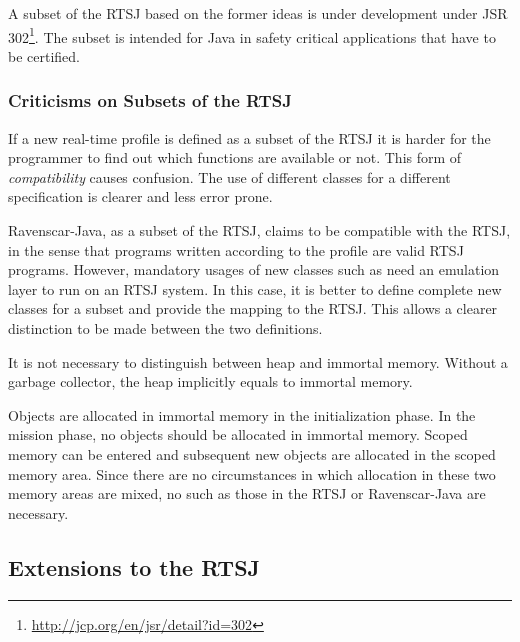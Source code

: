 A subset of the RTSJ based on the former ideas is under development
under JSR 302\footnote{\url{http://jcp.org/en/jsr/detail?id=302}}.
The subset is intended for Java in safety critical applications that
have to be certified.

\subsubsection{Criticisms on Subsets of the RTSJ}

If a new real-time profile is defined as a subset of the RTSJ it is
harder for the programmer to find out which functions are available
or not. This form of \textit{compatibility} causes confusion. The
use of different classes for a different specification is clearer
and less error prone.

Ravenscar-Java, as a subset of the RTSJ, claims to be compatible
with the RTSJ, in the sense that programs written according to the
profile are valid RTSJ programs. However, mandatory usages of new
classes such as  need an emulation layer to run
on an RTSJ system. In this case, it is better to define complete new
classes for a subset and provide the mapping to the RTSJ. This
allows a clearer distinction to be made between the two definitions.

It is not necessary to distinguish between heap and immortal memory.
Without a garbage collector, the heap implicitly equals to immortal
memory.

Objects are allocated in immortal memory in the initialization
phase. In the mission phase, no objects should be allocated in
immortal memory. Scoped memory can be entered and subsequent new
objects are allocated in the scoped memory area. Since there are no
circumstances in which allocation in these two memory areas are
mixed, no  such as those in the RTSJ or
Ravenscar-Java are necessary.

\subsection{Extensions to the RTSJ}

